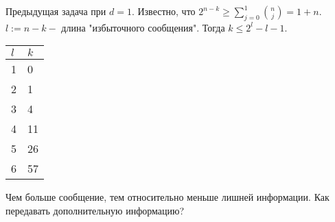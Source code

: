 
	Предыдущая задача при $d = 1$. Известно, что $\displaystyle 2^{n-k} \geqslant \sum_{j=0}^{1} \binom{n}{j} = 1+n$.\\
	$l := n - k -$ длина "избыточного сообщения". Тогда $k \leqslant 2^l - l - 1$.\\
	\begin{tabular}{ | l | l | }
		\hline
		$l$ & $k$ \\  \hline
		1 & 0 \\ \hline
		2 & 1 \\ \hline
		3 & 4 \\ \hline
		4 & 11 \\ \hline
		5 & 26 \\ \hline
		6 & 57 \\  \hline
	\end{tabular}
	Чем больше сообщение, тем относительно меньше лишней информации. Как передавать дополнительную информацию?

